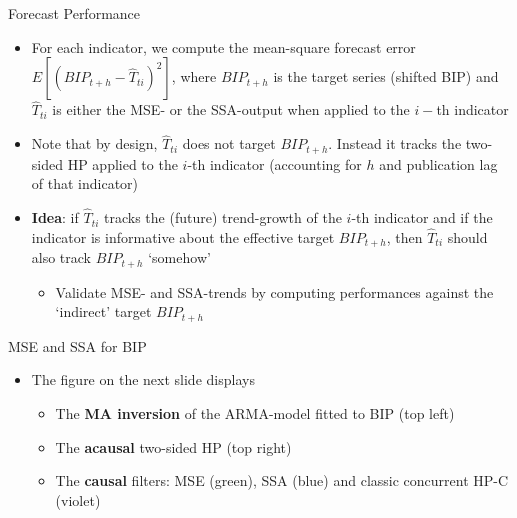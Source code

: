 \documentclass{beamer}
\begin{document}
\begin{frame} {Forecast Performance}\label{overf}
\begin{itemize}
\item For each indicator, we compute the mean-square forecast error $E[(BIP_{t+h}-\hat{T}_{ti})^2]$, where $BIP_{t+h}$ is the target series (shifted BIP) and $\hat{T}_{ti}$ is either the MSE- or the SSA-output when applied to  the $i-$th indicator
\item Note that by design, $\hat{T}_{ti}$ does not target $BIP_{t+h}$. Instead it tracks the two-sided HP applied to the $i$-th indicator (accounting for $h$ and publication lag of that indicator) 
\item \textbf{Idea}: if $\hat{T}_{ti}$ tracks the (future) trend-growth of the $i$-th indicator and if the indicator is informative about the effective target $BIP_{t+h}$, then $\hat{T}_{ti}$ should also track $BIP_{t+h}$ `somehow'
\begin{itemize}
\item Validate MSE- and SSA-trends by computing performances against the `indirect' target $BIP_{t+h}$ 
\end{itemize}
\end{itemize}
\end{frame}

\begin{frame} {MSE and SSA for BIP}
\begin{itemize}
\item The figure on the next slide displays
\begin{itemize}
\item The \textbf{MA inversion} of the ARMA-model fitted to BIP (top left)
\item The \textbf{acausal} two-sided HP (top right)
\item The \textbf{causal} filters: MSE (green), SSA (blue) and classic concurrent HP-C (violet)
\end{itemize}
\end{itemize}
\end{frame}
\end{document}
